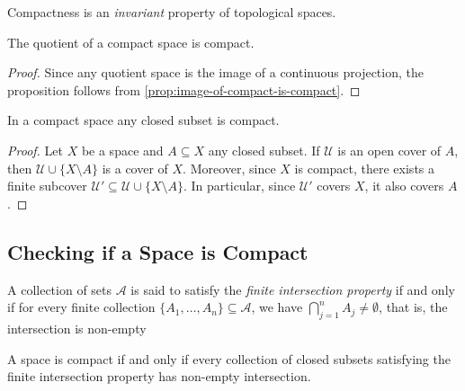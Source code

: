 \begin{corollary}
\label{cor:compactness-topological-invariant}
Compactness is an \emph{invariant} property of topological spaces.
\end{corollary}

\begin{corollary}
\label{cor:quotient-of-compact-space-is-compact}
The quotient of a compact space is compact.
\end{corollary}

\begin{proof}
Since any quotient space is the image of a continuous projection, the
proposition follows from \cref{prop:image-of-compact-is-compact}.
\end{proof}

\begin{proposition}
\label{prop:closed-subset-compact}
In a compact space any closed subset is compact.
\end{proposition}

\begin{proof}
Let \(X\) be a space and \(A \subseteq X\) any closed subset. If \(\mathcal{U}\)
is an open cover of \(A\), then \(\mathcal{U} \cup \{X \setminus A\}\) is a
cover of \(X\). Moreover, since \(X\) is compact, there exists a finite subcover
\(\mathcal{U}' \subseteq \mathcal{U} \cup \{X \setminus A\}\). In particular,
since \(\mathcal{U}'\) covers \(X\), it also covers \(A\).
\end{proof}

\subsection{Checking if a Space is Compact}

\begin{definition}
\label{def:finite-intersection-property}
A collection of sets \(\mathcal{A}\) is said to satisfy the
\emph{finite intersection property} if and only if for every finite collection
\(\{A_1, \dots, A_n\} \subseteq \mathcal{A}\), we have
\(\bigcap_{j=1}^n A_j \neq \emptyset\), that is, the intersection is non-empty
\end{definition}

\begin{proposition}
\label{prop:compact-iff-FIP}
A space is compact if and only if every collection of closed subsets satisfying
the finite intersection property has non-empty intersection.
\end{proposition}

